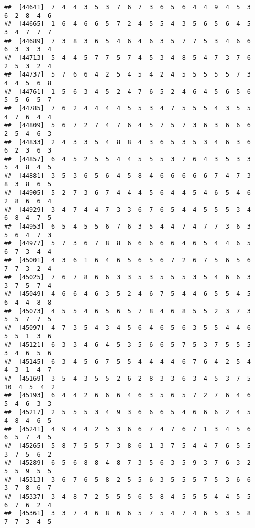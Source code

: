 \documentclass[
]{book}
\begin{document}
\begin{verbatim}
##  [44641]  7  4  4  3  5  3  7  6  7  3  6  5  6  4  4  9  4  5  3  6  2  8  4  6
##  [44665]  1  6  4  6  6  5  7  2  4  5  5  4  3  5  6  5  6  4  5  3  4  7  7  7
##  [44689]  7  3  8  3  6  5  4  6  4  6  3  5  7  7  5  3  4  6  6  6  3  3  3  4
##  [44713]  5  4  4  5  7  7  5  7  4  5  3  4  8  5  4  7  3  7  6  2  5  3  2  4
##  [44737]  5  7  6  6  4  2  5  4  5  4  2  4  5  5  5  5  5  7  3  4  4  5  6  8
##  [44761]  1  5  6  3  4  5  2  4  7  6  5  2  4  6  4  5  6  5  6  5  5  6  5  7
##  [44785]  7  6  2  4  4  4  4  5  5  3  4  7  5  5  5  4  3  5  5  4  7  6  4  4
##  [44809]  5  6  7  2  7  4  7  6  4  5  7  5  7  3  6  3  6  6  6  2  5  4  6  3
##  [44833]  2  4  3  3  5  4  8  8  4  3  6  5  3  5  3  4  6  3  6  6  2  3  6  3
##  [44857]  6  4  5  2  5  5  4  4  5  5  5  3  7  6  4  3  5  3  3  5  4  8  4  5
##  [44881]  3  5  3  6  5  6  4  5  8  4  6  6  6  6  6  7  4  7  3  8  3  8  6  5
##  [44905]  5  2  7  3  6  7  4  4  4  5  6  4  4  5  4  6  5  4  6  2  8  6  6  4
##  [44929]  3  4  7  4  4  7  3  3  6  7  6  5  4  4  5  5  5  3  4  6  8  4  7  5
##  [44953]  6  5  4  5  5  6  7  6  3  5  4  4  7  4  7  7  3  6  3  5  6  4  7  3
##  [44977]  5  7  3  6  7  8  8  6  6  6  6  6  4  6  5  4  4  6  5  6  7  3  4  4
##  [45001]  4  3  6  1  6  4  6  5  6  5  6  7  2  6  7  5  6  5  6  7  7  3  2  4
##  [45025]  7  6  7  8  6  6  3  3  5  3  5  5  5  3  5  4  6  6  3  3  7  5  7  4
##  [45049]  4  6  6  4  6  3  5  2  4  6  7  5  4  4  6  5  5  4  5  6  4  4  8  8
##  [45073]  4  5  5  4  6  5  6  5  7  8  4  6  8  5  5  2  3  7  3  5  5  7  7  5
##  [45097]  4  7  3  5  4  3  4  5  6  4  6  5  6  3  5  5  4  4  6  5  5  1  3  6
##  [45121]  6  3  3  4  6  4  5  3  5  6  6  5  7  5  3  7  5  5  5  3  4  6  5  6
##  [45145]  6  3  4  5  6  7  5  5  4  4  4  4  6  7  6  4  2  5  4  4  3  1  4  7
##  [45169]  3  5  4  3  5  5  2  6  2  8  3  3  6  3  4  5  3  7  5 10  4  5  4  2
##  [45193]  6  4  4  2  6  6  6  4  6  3  5  6  5  7  2  7  6  4  6  5  4  6  3  3
##  [45217]  2  5  5  5  3  4  9  3  6  6  6  5  4  6  6  6  2  4  5  4  8  4  6  5
##  [45241]  4  9  4  4  2  5  3  6  6  7  4  7  6  7  1  3  4  5  6  6  5  7  4  5
##  [45265]  5  8  7  5  5  7  3  8  6  1  3  7  5  4  4  7  6  5  5  3  7  5  6  2
##  [45289]  6  5  6  8  8  4  8  7  3  5  6  3  5  9  3  7  6  3  2  5  5  9  5  5
##  [45313]  3  6  7  6  5  8  2  5  5  6  3  5  5  5  7  5  3  6  6  3  7  8  6  7
##  [45337]  3  4  8  7  2  5  5  5  6  5  8  4  5  5  5  4  4  5  5  6  7  6  2  4
##  [45361]  3  3  7  4  6  8  6  6  5  7  5  4  7  4  6  5  3  5  8  7  7  3  4  5

\end{verbatim}
\end{document}
